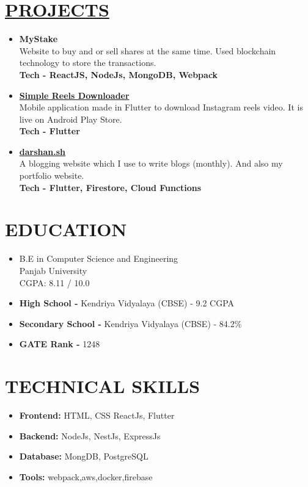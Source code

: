 \documentclass[line, margin, 12pt]{res}
\begin{document}
\begin{resume}
\section{\hyperref[https://www.github.com/darshansharma]{PROJECTS}}
\begin{itemize}
\item \textbf{{MyStake}}\\
Website to buy and or sell shares at the same time.  Used blockchain technology to store the transactions.\\
 \textbf{Tech - ReactJS, NodeJs,  MongoDB, Webpack}
\item \textbf{\href{https://play.google.com/store/apps/details?id=com.darshansharma.simple_reels_downloader}{Simple Reels Downloader}}\\
Mobile application made in Flutter to download Instagram reels video. It is live on Android Play Store.\\
 \textbf{Tech - Flutter}
\item \textbf{\href{https://darshan.sh}{darshan.sh }}\\
A blogging website which I use to write blogs (monthly). And also my portfolio website. \\
 \textbf{Tech - Flutter, Firestore, Cloud Functions}
\end{itemize}

\section{EDUCATION}
\begin{itemize}
\item B.E in Computer Science and Engineering \\
 Panjab University \\
CGPA: 8.11 / 10.0 \\
\item \textbf{High School -} Kendriya Vidyalaya (CBSE) - 9.2 CGPA
\item \textbf{Secondary School -} Kendriya Vidyalaya (CBSE) - 84.2\%
\item \textbf{GATE Rank -} 1248\\
\end{itemize}

\section{TECHNICAL SKILLS}
\begin{itemize}
\item \textbf{Frontend:} HTML, CSS ReactJs, Flutter
\item \textbf{Backend:} NodeJs, NestJs, ExpressJs
\item \textbf{Database:} MongDB, PostgreSQL
\item \textbf{Tools:} webpack,aws,docker,firebase
\end{itemize}

\end{resume}
\end{document}
